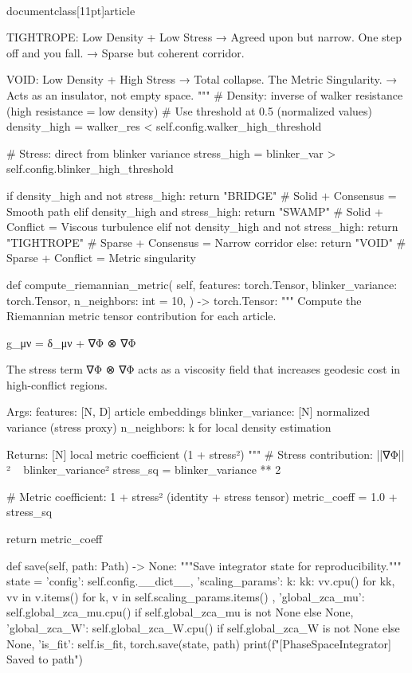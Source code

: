 \\documentclass[11pt]{article}
\begin{document}
\begin{CodeBlock}
        TIGHTROPE: Low Density + Low Stress
            → Agreed upon but narrow. One step off and you fall.
            → Sparse but coherent corridor.

        VOID: Low Density + High Stress
            → Total collapse. The Metric Singularity.
            → Acts as an insulator, not empty space.
        """
        # Density: inverse of walker resistance (high resistance = low density)
        # Use threshold at 0.5 (normalized values)
        density_high = walker_res < self.config.walker_high_threshold

        # Stress: direct from blinker variance
        stress_high = blinker_var > self.config.blinker_high_threshold

        if density_high and not stress_high:
            return "BRIDGE"      # Solid + Consensus = Smooth path
        elif density_high and stress_high:
            return "SWAMP"       # Solid + Conflict = Viscous turbulence
        elif not density_high and not stress_high:
            return "TIGHTROPE"   # Sparse + Consensus = Narrow corridor
        else:
            return "VOID"        # Sparse + Conflict = Metric singularity

    def compute_riemannian_metric(
        self,
        features: torch.Tensor,
        blinker_variance: torch.Tensor,
        n_neighbors: int = 10,
    ) -> torch.Tensor:
        """
        Compute the Riemannian metric tensor contribution for each article.

        g_μν = δ_μν + ∇Φ ⊗ ∇Φ

        The stress term ∇Φ ⊗ ∇Φ acts as a viscosity field that
        increases geodesic cost in high-conflict regions.

        Args:
            features: [N, D] article embeddings
            blinker_variance: [N] normalized variance (stress proxy)
            n_neighbors: k for local density estimation

        Returns:
            [N] local metric coefficient (1 + stress²)
        """
        # Stress contribution: ||∇Φ||² ~ blinker_variance²
        stress_sq = blinker_variance ** 2

        # Metric coefficient: 1 + stress² (identity + stress tensor)
        metric_coeff = 1.0 + stress_sq

        return metric_coeff

    def save(self, path: Path) -> None:
        """Save integrator state for reproducibility."""
        state = {
            'config': self.config.__dict__,
            'scaling_params': {
                k: {kk: vv.cpu() for kk, vv in v.items()}
                for k, v in self.scaling_params.items()
            },
            'global_zca_mu': self.global_zca_mu.cpu() if self.global_zca_mu is not None else None,
            'global_zca_W': self.global_zca_W.cpu() if self.global_zca_W is not None else None,
            'is_fit': self.is_fit,
        }
        torch.save(state, path)
        print(f"[PhaseSpaceIntegrator] Saved to {path}")


\end{CodeBlock}
\end{document}
